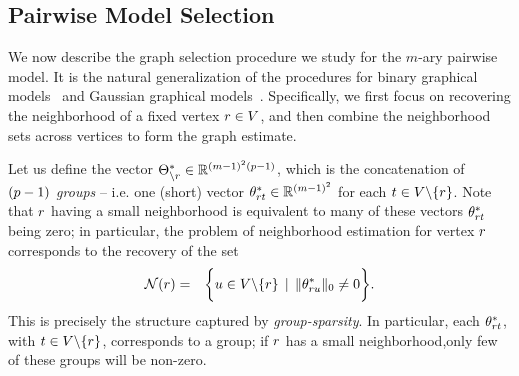 \subsection{Pairwise Model Selection}


We now describe the graph selection procedure we study for the $m$-ary pairwise model. It is the natural generalization of the procedures for binary graphical models~\citep{RWLIsing} and Gaussian graphical models~\citep{Meinshausen:06}.  Specifically, we first focus on recovering the neighborhood of a fixed vertex $r \in V$, and then combine the neighborhood sets across vertices to form the graph estimate.

\noindent Let us define the vector $\Theta^*_{\backslash r} \in \mathbb{R}^{(m-1)^2(p-1)}$, which is the concatenation of $(p -1)$ {\em groups} -- i.e. one (short) vector $\theta^*_{r t} \in \mathbb{R}^{(m-1)^2}$ for each $t\in V\backslash\{r\}$. Note that $r$ having a small neighborhood is equivalent to many of these vectors $\theta^*_{r t}$ being zero; in particular, the problem of neighborhood estimation for vertex $r$ corresponds to the recovery of the set
\begin{eqnarray*}
\mathcal{N}(r) & = & \biggr \{ u \in V \backslash \{r\} \, \mid
\, \|\theta^*_{r u}\|_0 \neq 0 \biggr \}.
\end{eqnarray*}
This is precisely the structure captured by \emph{group-sparsity}. In particular, each $\theta^*_{r t}$, with $t\in V\backslash\{r\}$, corresponds to a group; if $r$ has a small neighborhood,only few of these groups will be non-zero. 

